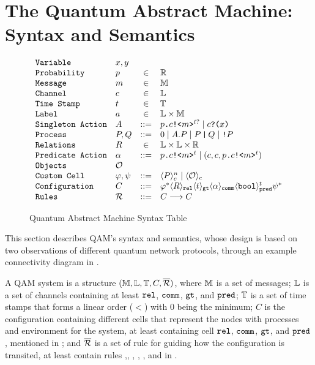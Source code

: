 \section{The Quantum Abstract Machine:  Syntax and Semantics} \label{sec:qam}

\begin{figure}[t]
{\small
  \[\begin{array}{llcl} 
      \texttt{Variable} & x,y \\
      \texttt{Probability} & p &\in &\mathbb{R}\\
      \texttt{Message} & m &\in& \mathbb{M}\\
    \texttt{Channel} & c &\in& \mathbb{L}\\
    \texttt{Time Stamp} & t &\in& \mathbb{T}\\
    \texttt{Label} & a &\in& \mathbb{L} \times \mathbb{M}\\
      \texttt{Singleton Action} & A & ::= & p\texttt{.}c\texttt{!<}m\texttt{>}^{t?} \mid c\texttt{?(}x\texttt{)} \\
      \texttt{Process} & P,Q & ::= & 0 \mid A.P \mid P\,\texttt{|}\,Q \mid \texttt{!}P \\
      \texttt{Relations} & R & \in & \mathbb{L} \times \mathbb{L} \times \mathbb{R} \\
      \texttt{Predicate Action} & \alpha & ::= & p\texttt{.}c\texttt{!<}m\texttt{>}^t \mid (c,c,p\texttt{.}c\texttt{!<}m\texttt{>}^t) \\
      \texttt{Objects} & \mathcal{O} \\
      \texttt{Custom Cell} & \varphi,\psi & ::= & \langle P \rangle^{n}_{c} \mid \langle \mathcal{O} \rangle_{c}\\
      \texttt{Configuration} & C & ::= & \varphi^* \langle R \rangle_{\texttt{rel}} \langle t \rangle_{\texttt{gt}}
                             \langle \alpha \rangle_{\texttt{comm}} \langle \texttt{bool} \rangle^{t}_{\texttt{pred}} \psi^* \\
      \texttt{Rules} & \mathcal{R} & ::= & C \longrightarrow C \\
    \end{array}
  \]
}
\caption{Quantum Abstract Machine Syntax Table}
  \label{fig:q-pi-syntax}
\end{figure}

This section describes QAM's syntax and semantics,
whose design is based on two observations of different quantum network protocols, through an example connectivity diagram in .

A QAM system is a structure $(\mathbb{M},\mathbb{L},\mathbb{T},C,\overline{\mathcal{R}})$,
where $\mathbb{M}$ is a set of messages;
$\mathbb{L}$ is a set of channels containing at least $\texttt{rel}$, $\texttt{comm}$, $\texttt{gt}$, and $\texttt{pred}$;
$\mathbb{T}$ is a set of time stamps that forms a linear order ($<$) with $0$ being the minimum;
$C$ is the configuration containing different cells that represent the nodes with processes and environment for the system, at least containing cell $\texttt{rel}$, $\texttt{comm}$, $\texttt{gt}$, and $\texttt{pred}$, mentioned in ;
and $\overline{\mathcal{R}}$ is a set of rule for guiding how the configuration is transited, at least contain rules ,, , , , and  in . 




